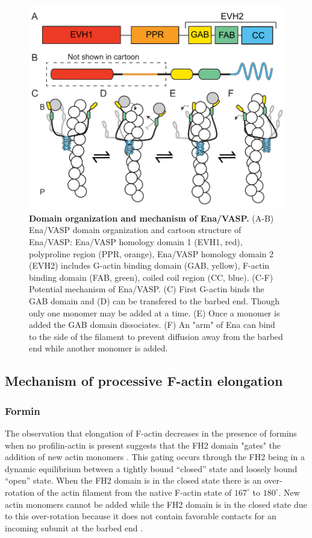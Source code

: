 \begin{figure}
\centering
\includegraphics[width=13cm]{img/ch01/Ena_mech.pdf}
\caption[Domain organization and mechanism of Ena/VASP.]{\textbf{Domain organization and mechanism of Ena/VASP.} (A-B) Ena/VASP domain organization and cartoon structure of Ena/VASP: Ena/VASP homology domain 1 (EVH1, red), polyproline region (PPR, orange), Ena/VASP homology domain 2 (EVH2) includes G-actin binding domain (GAB, yellow), F-actin binding domain (FAB, green), coiled coil region (CC, blue). (C-F) Potential mechanism of Ena/VASP. (C) First G-actin binds the GAB domain and (D) can be transfered to the barbed end. Though only one monomer may be added at a time. (E) Once a monomer is added the GAB domain dissociates. (F) An "arm" of Ena can bind to the side of the filament to prevent diffusion away from the barbed end while another monomer is added.}
\label{fig:ena-domain}
\end{figure}

\subsection{Mechanism of processive F-actin elongation}\label{ena-formin mechanism}

\subsubsection{Formin}

The observation that elongation of F-actin decreases in the presence of formins when no profilin-actin is present suggests that the FH2 domain "gates" the addition of new actin monomers \citep{kovar_control_2006,otomo_structural_2005,vavylonis_model_2006}. This gating occurs through the FH2 being in a dynamic equilibrium between a tightly bound “closed” state and loosely bound “open” state. When the FH2 domain is in the closed state there is an over-rotation of the actin filament from the native F-actin state of $167^{\circ}$ to $180^{\circ}$. New actin monomers cannot be added while the FH2 domain is in the closed state due to this over-rotation because it does not contain favorable contacts for an incoming subunit at the barbed end \citep{otomo_structural_2005}.

